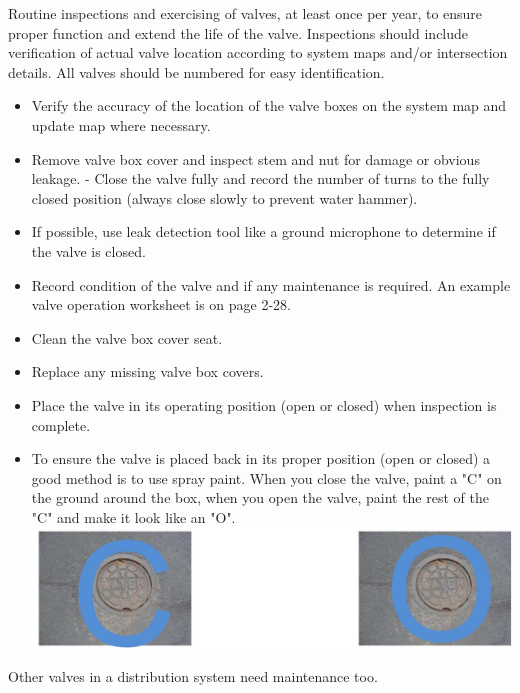 \documentclass[10pt]{article}
\begin{document}
Routine inspections and exercising of valves, at least once per year, to ensure proper function and extend the life of the valve. Inspections should include verification of actual valve location according to system maps and/or intersection details. All valves should be numbered for easy identification.

\begin{itemize}
  \item Verify the accuracy of the location of the valve boxes on the system map and update map where necessary.

  \item Remove valve box cover and inspect stem and nut for damage or obvious leakage. - Close the valve fully and record the number of turns to the fully closed position (always close slowly to prevent water hammer).

  \item If possible, use leak detection tool like a ground microphone to determine if the valve is closed.

  \item Record condition of the valve and if any maintenance is required. An example valve operation worksheet is on page 2-28.

  \item Clean the valve box cover seat.

  \item Replace any missing valve box covers.

  \item Place the valve in its operating position (open or closed) when inspection is complete.

  \item To ensure the valve is placed back in its proper position (open or closed) a good method is to use spray paint. When you close the valve, paint a "C" on the ground around the box, when you open the valve, paint the rest of the "C" and make it look like an "O".\\

\includegraphics[max width=\textwidth]{2022_10_30_098bb5f44c5986ff92a9g-37}

\end{itemize}
Other valves in a distribution system need maintenance too.
\end{document}
